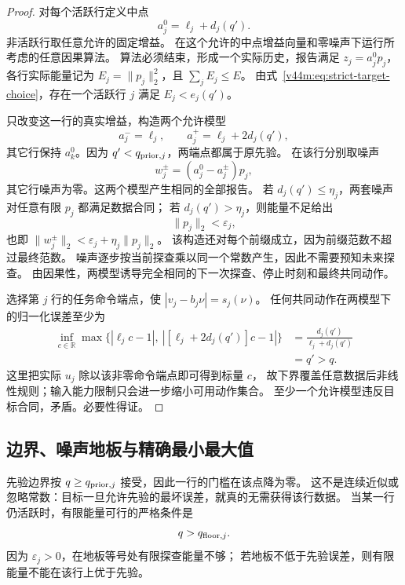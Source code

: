 \documentclass[11pt,a4paper]{article}
\numberwithin{equation}{section}
\theoremstyle{definition}
\begin{document}
\begin{proof}
对每个活跃行定义中点
\begin{equation}
 a_j^0=\ell_j+d_j(q').
\end{equation}
非活跃行取任意允许的固定增益。
在这个允许的中点增益向量和零噪声下运行所考虑的任意因果算法。
算法必须结束，形成一个实际历史，报告满足 $z_j=a_j^0p_j$，
各行实际能量记为 $E_j=\|p_j\|_2^2$，且 $\sum_jE_j\le E$。
由式~\eqref{v44m:eq:strict-target-choice}，存在一个活跃行 $j$ 满足
$E_j<e_j(q')$。

只改变这一行的真实增益，构造两个允许模型
\begin{equation}
 a_j^- =\ell_j,\qquad
 a_j^+=\ell_j+2d_j(q'),
 \label{v44m:eq:indistinguishable-pair}
\end{equation}
其它行保持 $a_k^0$。因为 $q'<q_{{\rm prior},j}$，两端点都属于原先验。
在该行分别取噪声
\begin{equation}
 w_j^\pm=(a_j^0-a_j^\pm)p_j,
\end{equation}
其它行噪声为零。这两个模型产生相同的全部报告。
若 $d_j(q')\le\eta_j$，两套噪声对任意有限 $p_j$ 都满足数据合同；
若 $d_j(q')>\eta_j$，则能量不足给出
\begin{equation}
 [d_j(q')-\eta_j]\|p_j\|_2<\varepsilon_j,
\end{equation}
也即 $\|w_j^\pm\|_2<\varepsilon_j+\eta_j\|p_j\|_2$。
该构造还对每个前缀成立，因为前缀范数不超过最终范数。
噪声逐步按当前探查乘以同一个常数产生，因此不需要预知未来探查。
由因果性，两模型诱导完全相同的下一次探查、停止时刻和最终共同动作。

选择第 $j$ 行的任务命令端点，使 $|v_j-b_j\nu|=s_j(\nu)$。
任何共同动作在两模型下的归一化误差至少为
\begin{align}
 \inf_{c\in\mathbb R}
 \max\{|\ell_jc-1|,\ |[\ell_j+2d_j(q')]c-1|\}
 &=\frac{d_j(q')}{\ell_j+d_j(q')}\\
 &=q'>q.
 \label{v44m:eq:pair-relative-error}
\end{align}
这里把实际 $u_j$ 除以该非零命令端点即可得到标量 $c$，
故下界覆盖任意数据后非线性规则；输入能力限制只会进一步缩小可用动作集合。
至少一个允许模型违反目标合同，矛盾。必要性得证。
\end{proof}

\subsection{边界、噪声地板与精确最小最大值}

先验边界按 $q\ge q_{{\rm prior},j}$ 接受，因此一行的门槛在该点降为零。
这不是连续近似或忽略常数：目标一旦允许先验的最坏误差，就真的无需获得该行数据。
当某一行仍活跃时，有限能量可行的严格条件是
\begin{equation}
 q>q_{{\rm floor},j}.
\end{equation}
因为 $\varepsilon_j>0$，在地板等号处有限探查能量不够；
若地板不低于先验误差，则有限能量不能在该行上优于先验。
\end{document}
